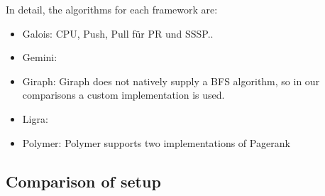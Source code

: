 In detail, the algorithms for each framework are:
\begin{itemize}
	\item Galois: CPU, Push, Pull für PR und SSSP..
	\item Gemini:
	\item Giraph: Giraph does not natively supply a BFS algorithm, so in our comparisons a custom implementation is used.
	\item Ligra:
	\item Polymer: Polymer supports two implementations of Pagerank
\end{itemize}












\subsection{Comparison of setup}

